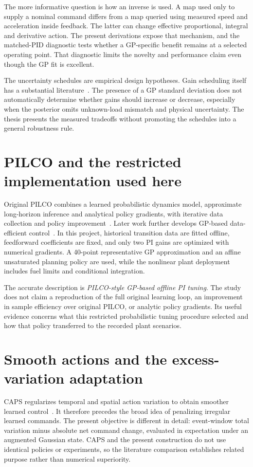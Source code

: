 The more informative question is how an inverse is used. A map used only to supply a nominal command differs from a map queried using measured speed and acceleration inside feedback. The latter can change effective proportional, integral and derivative action. The present derivations expose that mechanism, and the matched-PID diagnostic tests whether a GP-specific benefit remains at a selected operating point. That diagnostic limits the novelty and performance claim even though the GP fit is excellent.

The uncertainty schedules are empirical design hypotheses. Gain scheduling itself has a substantial literature~\cite{scheduling}. The presence of a GP standard deviation does not automatically determine whether gains should increase or decrease, especially when the posterior omits unknown-load mismatch and physical uncertainty. The thesis presents the measured tradeoffs without promoting the schedules into a general robustness rule.

\section{PILCO and the restricted implementation used here}
Original PILCO combines a learned probabilistic dynamics model, approximate long-horizon inference and analytical policy gradients, with iterative data collection and policy improvement~\cite{pilco}. Later work further develops GP-based data-efficient control~\cite{deisenroth}. In this project, historical transition data are fitted offline, feedforward coefficients are fixed, and only two PI gains are optimized with numerical gradients. A 40-point representative GP approximation and an affine unsaturated planning policy are used, while the nonlinear plant deployment includes fuel limits and conditional integration.

The accurate description is \emph{PILCO-style GP-based offline PI tuning}. The study does not claim a reproduction of the full original learning loop, an improvement in sample efficiency over original PILCO, or analytic policy gradients. Its useful evidence concerns what this restricted probabilistic tuning procedure selected and how that policy transferred to the recorded plant scenarios.

\section{Smooth actions and the excess-variation adaptation}
CAPS regularizes temporal and spatial action variation to obtain smoother learned control~\cite{caps}. It therefore precedes the broad idea of penalizing irregular learned commands. The present objective is different in detail: event-window total variation minus absolute net command change, evaluated in expectation under an augmented Gaussian state. CAPS and the present construction do not use identical policies or experiments, so the literature comparison establishes related purpose rather than numerical superiority.


